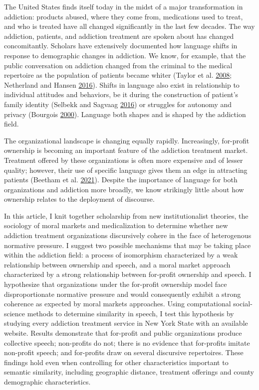 \documentclass[
  12pt,
]{article}
\begin{document}
The United States finds itself today in the midst of a major transformation in addiction: products abused, where they come from, medications used to treat, and who is treated have all changed significantly in the last few decades. The way addiction, patients, and addiction treatment are spoken about has changed concomitantly. Scholars have extensively documented how language shifts in response to demographic changes in addiction. We know, for example, that the public conversation on addiction changed from the criminal to the medical repertoire as the population of patients became whiter (Taylor et al. \protect\hyperlink{ref-taylor2008}{2008}; Netherland and Hansen \protect\hyperlink{ref-netherland2016}{2016}). Shifts in language also exist in relationship to individual attitudes and behaviors, be it during the construction of patient's family identity (Selbekk and Sagvaag \protect\hyperlink{ref-selbekk2016}{2016}) or struggles for autonomy and privacy (Bourgois \protect\hyperlink{ref-bourgois2000}{2000}). Language both shapes and is shaped by the addiction field.

\vspace{12pt}

The organizational landscape is changing equally rapidly. Increasingly, for-profit ownership is becoming an important feature of the addiction treatment market. Treatment offered by these organizations is often more expensive and of lesser quality; however, their use of specific language gives them an edge in attracting patients (Beetham et al. \protect\hyperlink{ref-beetham2021}{2021}). Despite the importance of language for both organizations and addiction more broadly, we know strikingly little about how ownership relates to the deployment of discourse.

\vspace{12pt}

In this article, I knit together scholarship from new institutionalist theories, the sociology of moral markets and medicalization to determine whether new addiction treatment organizations discursively cohere in the face of heterogenous normative pressure. I suggest two possible mechanisms that may be taking place within the addiction field: a process of isomorphism characterized by a weak relationship between ownership and speech, and a moral market approach characterized by a strong relationship between for-profit ownership and speech. I hypothesize that organizations under the for-profit ownership model face disproportionate normative pressure and would consequently exhibit a strong coherence as expected by moral markets approaches. Using computational social-science methods to determine similarity in speech, I test this hypothesis by studying every addiction treatment service in New York State with an available website. Results demonstrate that for-profit and public organizations produce collective speech; non-profits do not; there is no evidence that for-profits imitate non-profit speech; and for-profits draw on several discursive repertoires. These findings hold even when controlling for other characteristics important to semantic similarity, including geographic distance, treatment offerings and county demographic characteristics.
\end{document}
